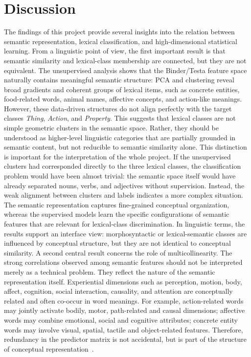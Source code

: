 \documentclass{ipgpmaster}
\begin{document}
\vspace{0.5cm}

\section{Discussion}
\label{sec:discussion}

The findings of this project provide several insights into the relation between semantic representation, lexical classification, and high-dimensional statistical learning. From a linguistic point of view, the first important result is that semantic similarity and lexical-class membership are connected, but they are not equivalent. The unsupervised analysis shows that the Binder/Testa feature space naturally contains meaningful semantic structure: PCA and clustering reveal broad gradients and coherent groups of lexical items, such as concrete entities, food-related words, animal names, affective concepts, and action-like meanings. However, these data-driven structures do not align perfectly with the target classes \emph{Thing}, \emph{Action}, and \emph{Property}. This suggests that lexical classes are not simple geometric clusters in the semantic space. Rather, they should be understood as higher-level linguistic categories that are partially grounded in semantic content, but not reducible to semantic similarity alone.
This distinction is important for the interpretation of the whole project. If the unsupervised clusters had corresponded directly to the three lexical classes, the classification problem would have been almost trivial: the semantic space itself would have already separated nouns, verbs, and adjectives without supervision. Instead, the weak alignment between clusters and labels indicates a more complex situation. The semantic representation captures fine-grained conceptual organization, whereas the supervised models learn the specific configurations of semantic features that are relevant for lexical-class discrimination. In linguistic terms, the results support an interface view: morphosyntactic or lexical-semantic classes are influenced by conceptual structure, but they are not identical to conceptual similarity.
A second central result concerns the role of multicollinearity. The strong correlations observed among semantic features should not be interpreted merely as a technical problem. They reflect the nature of the semantic representation itself. Experiential dimensions such as perception, motion, body, affect, cognition, social interaction, causality, and attention are conceptually related and often co-occur in word meanings. For example, action-related words may jointly activate bodily, motor, path-related and causal dimensions; affective words may combine emotional, social and cognitive attributes; concrete entity words may involve visual, spatial, tactile and object-related features. Therefore, redundancy in the predictor matrix is not accidental, but is part of the structure of conceptual representation~\cite{mcrae1997nature,cree2003analyzing,binder2016toward}.
\end{document}
